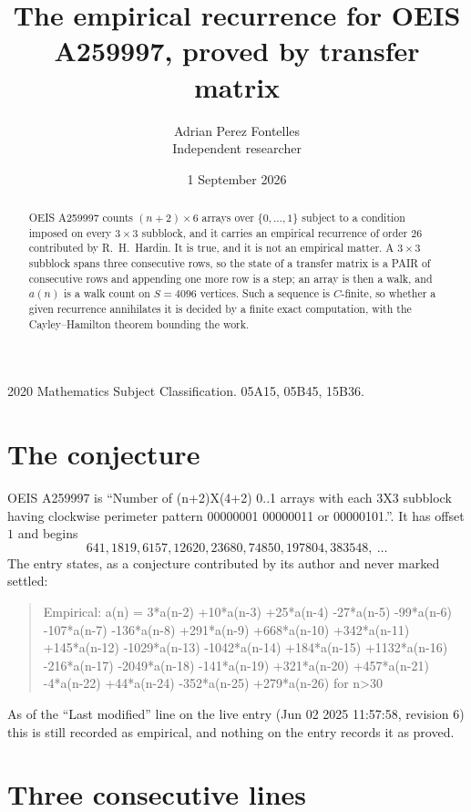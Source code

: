 \documentclass[11pt,a4paper]{article}
\title{The empirical recurrence for OEIS A259997, proved by transfer matrix}
\author{Adrian Perez Fontelles\\ \small Independent researcher}
\date{1 September 2026}
\theoremstyle{plain}
\theoremstyle{definition}
\begin{document}
\maketitle

\begin{abstract}
OEIS A259997 counts $(n+2)\times6$ arrays over $\{0,\dots,1\}$ subject to a condition imposed on
every $3\times3$ subblock, and it carries an empirical recurrence of order $26$
contributed by R.~H.~Hardin. It is true, and it is not an empirical matter. A $3\times3$
subblock spans three consecutive rows, so the state of a transfer matrix is a PAIR of
consecutive rows and appending one more row is a step; an array is then a walk, and
$a(n)$ is a walk count on $S=4096$ vertices. Such a sequence is $C$-finite, so whether a given
recurrence annihilates it is decided by a finite exact computation, with the Cayley--Hamilton
theorem bounding the work.
\end{abstract}

\noindent\small 2020 Mathematics Subject Classification. 05A15, 05B45, 15B36.\normalsize

\section{The conjecture}

OEIS A259997 is ``Number of (n+2)X(4+2) 0..1 arrays with each 3X3 subblock having clockwise perimeter pattern 00000001 00000011 or 00000101.''. It has offset $1$ and begins
\[
641, 1819, 6157, 12620, 23680, 74850, 197804, 383548,\ \dots
\]
The entry states, as a conjecture contributed by its author and never marked settled:
\begin{quote}
Empirical: a(n) = 3*a(n-2) +10*a(n-3) +25*a(n-4) -27*a(n-5) -99*a(n-6) -107*a(n-7) -136*a(n-8) +291*a(n-9) +668*a(n-10) +342*a(n-11) +145*a(n-12) -1029*a(n-13) -1042*a(n-14) +184*a(n-15) +1132*a(n-16) -216*a(n-17) -2049*a(n-18) -141*a(n-19) +321*a(n-20) +457*a(n-21) -4*a(n-22) +44*a(n-24) -352*a(n-25) +279*a(n-26) for n>30
\end{quote}
As of the ``Last modified'' line on the live entry (Jun 02 2025 11:57:58, revision 6) this is still
recorded as empirical, and nothing on the entry records it as proved.

\section{Three consecutive lines}
\end{document}
